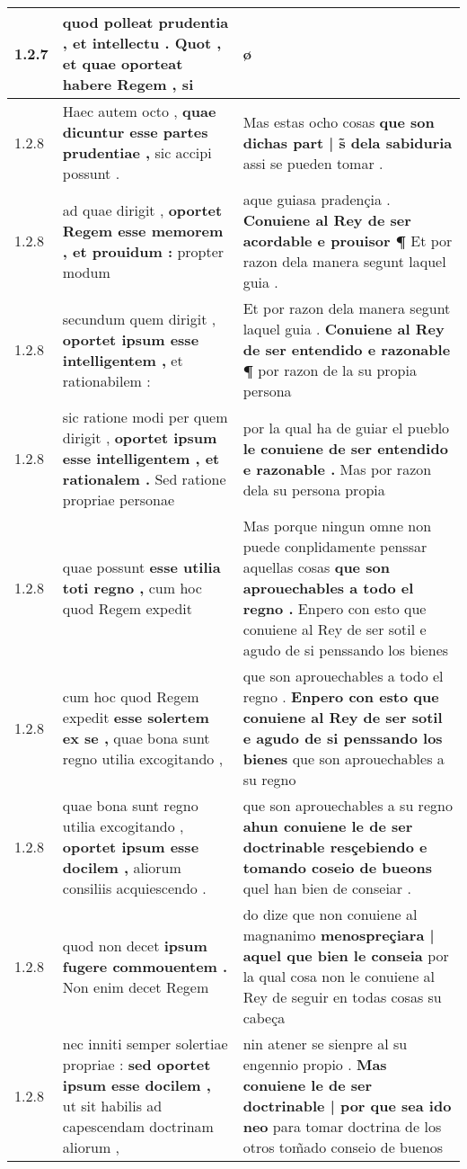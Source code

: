 \begin{tabular}{|p{1cm}|p{6.5cm}|p{6.5cm}|}
1.2.7 & quod polleat prudentia , et intellectu . \textbf{ Quot , et quae oporteat habere Regem , } si & ø \\\hline
1.2.8 & Haec autem octo , \textbf{ quae dicuntur esse partes prudentiae , } sic accipi possunt . & Mas estas ocho cosas \textbf{ que son dichas part | s̃ dela sabiduria } assi se pueden tomar . \\\hline
1.2.8 & ad quae dirigit , \textbf{ oportet Regem esse memorem , et prouidum : } propter modum & aque guiasa pradençia . \textbf{ Conuiene al Rey de ser acordable e prouisor ¶ } Et por razon dela manera segunt laquel guia . \\\hline
1.2.8 & secundum quem dirigit , \textbf{ oportet ipsum esse intelligentem , } et rationabilem : & Et por razon dela manera segunt laquel guia . \textbf{ Conuiene al Rey de ser entendido e razonable ¶ } por razon de la su propia persona \\\hline
1.2.8 & sic ratione modi per quem dirigit , \textbf{ oportet ipsum esse intelligentem , et rationalem . } Sed ratione propriae personae & por la qual ha de guiar el pueblo \textbf{ le conuiene de ser entendido e razonable . } Mas por razon dela su persona propia \\\hline
1.2.8 & quae possunt \textbf{ esse utilia toti regno , } cum hoc quod Regem expedit & Mas porque ningun omne non puede conplidamente penssar aquellas cosas \textbf{ que son aprouechables a todo el regno . } Enpero con esto que conuiene al Rey de ser sotil e agudo de si penssando los bienes \\\hline
1.2.8 & cum hoc quod Regem expedit \textbf{ esse solertem ex se , } quae bona sunt regno utilia excogitando , & que son aprouechables a todo el regno . \textbf{ Enpero con esto que conuiene al Rey de ser sotil e agudo de si penssando los bienes } que son aprouechables a su regno \\\hline
1.2.8 & quae bona sunt regno utilia excogitando , \textbf{ oportet ipsum esse docilem , } aliorum consiliis acquiescendo . & que son aprouechables a su regno \textbf{ ahun conuiene le de ser doctrinable resçebiendo e tomando coseio de bueons } quel han bien de conseiar . \\\hline
1.2.8 & quod non decet \textbf{ ipsum fugere commouentem . } Non enim decet Regem & do dize que non conuiene al magnanimo \textbf{ menospreçiara | aquel que bien le conseia } por la qual cosa non le conuiene al Rey de seguir en todas cosas su cabeça \\\hline
1.2.8 & nec inniti semper solertiae propriae : \textbf{ sed oportet ipsum esse docilem , } ut sit habilis ad capescendam doctrinam aliorum , & nin atener se sienpre al su engennio propio . \textbf{ Mas conuiene le de ser doctrinable | por que sea ido neo } para tomar doctrina de los otros tom̃ado conseio de buenos \\\hline

\end{tabular}
